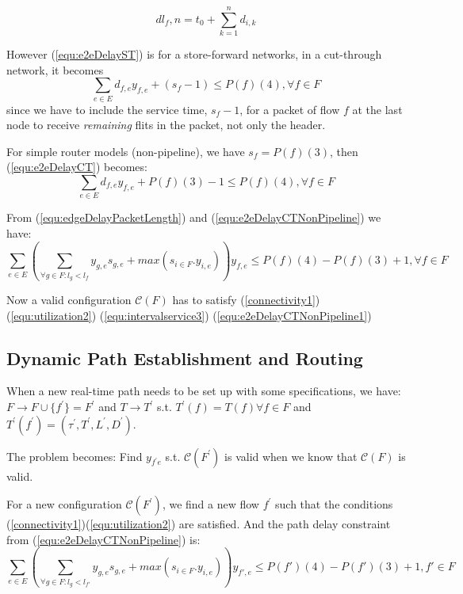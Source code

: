 \documentclass[a4]{article}
\begin{document}
\begin{equation}\label{equ:deadline2}
dl_f,n=t_0 + \sum_{k=1}^{n}d_{i,k}
\end{equation}

However (\ref{equ:e2eDelayST}) is for a store-forward networks, in a
cut-through network, it becomes
\begin{equation}\label{equ:e2eDelayCT}
\sum_{e \in E}d_{f,e}y_{f,e} + (s_f - 1) \leq P(f)(4), \forall f \in F
\end{equation}
since we have to include the service time, $s_f-1$, for a packet of flow $f$ at
the last node to receive {\em remaining} flits in the packet, not only the
header.

For simple router models (non-pipeline), we have $s_f = P(f)(3)$, then
(\ref{equ:e2eDelayCT}) becomes:
\begin{equation}\label{equ:e2eDelayCTNonPipeline}
\sum_{e \in E}d_{f,e}y_{f,e} + P(f)(3) - 1 \leq P(f)(4), \forall f \in F
\end{equation}

From (\ref{equ:edgeDelayPacketLength}) and (\ref{equ:e2eDelayCTNonPipeline}) we have:
\begin{equation}\label{equ:e2eDelayCTNonPipeline1}
\sum_{e \in E} (\sum_{\forall g \in F:l_g <
l_{f}}y_{g,e}s_{g,e}+max(s_{i \in F}.y_{i,e}))y_{f,e} \leq P(f)(4)-P(f)(3) + 1,
\forall f \in F
\end{equation}

Now a valid configuration $\mathcal{C}(F)$ has to satisfy (\ref{connectivity1}) 
(\ref{equ:utilization2})
(\ref{equ:intervalservice3}) (\ref{equ:e2eDelayCTNonPipeline1})

\subsection{Dynamic Path Establishment and Routing}
When a new real-time path needs to be set up with some specifications, we have:
$F \rightarrow F \cup \{f^{'} \}=F^{'}$
and $T \rightarrow T^{'}$ s.t. $T^{'} (f)=T(f)\forall f \in F$ and $T^{'} (f^{'} )=(\tau ^{'}, T^{'}, L^{'}, D^{'})$.

The problem becomes: Find $y_{f^{'}e}$ s.t. $\mathcal{C}(F^{'})$ is valid
when we know that $\mathcal{C}(F)$ is valid.

For a new configuration $\mathcal{C}(F^{'})$, we find a new flow $f^{'}$ such that
the conditions (\ref{connectivity1})(\ref{equ:utilization2}) are satisfied. And
the path delay constraint from (\ref{equ:e2eDelayCTNonPipeline}) is:
\begin{equation}\label{equ:e2eDelayNewPath}
\sum_{e \in E} (\sum_{\forall g \in F:l_g <
l_{f'}}y_{g,e}s_{g,e}+max(s_{i \in F}.y_{i,e}))y_{f',e} \leq P(f')(4)-P(f')(3) +
1, f' \in F
\end{equation}
\end{document}
